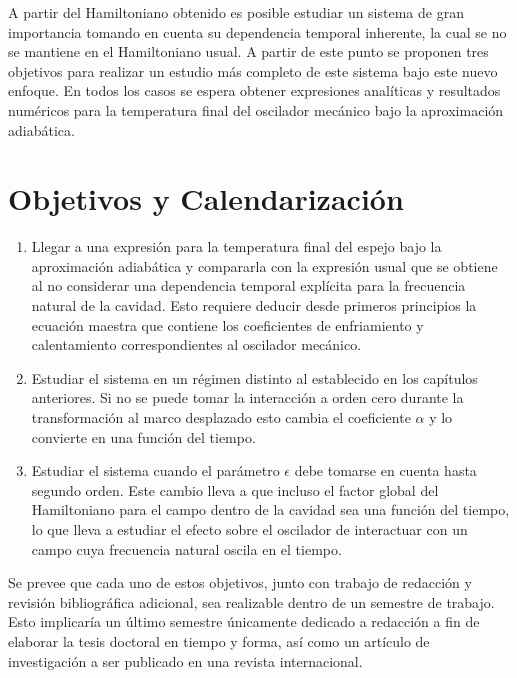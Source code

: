 \documentclass[10pt,a4paper]{report}
\begin{document}
A partir del Hamiltoniano obtenido es posible estudiar un sistema de gran importancia tomando en cuenta su dependencia temporal inherente, la cual se no se mantiene en el Hamiltoniano usual\cite{CavesIF}. A partir de este punto se proponen tres objetivos para realizar un estudio más completo de este sistema bajo este nuevo enfoque. En todos los casos se espera obtener expresiones analíticas y resultados numéricos  para la temperatura final del oscilador mecánico bajo la aproximación adiabática.

\section{Objetivos y Calendarización}

\begin{enumerate}
\item Llegar a una expresión para la temperatura final del espejo bajo la aproximación adiabática y compararla con la expresión usual que se obtiene al no considerar una dependencia temporal explícita para la frecuencia natural de la cavidad. Esto requiere deducir desde primeros principios la ecuación maestra que contiene los coeficientes de enfriamiento y calentamiento correspondientes al oscilador mecánico.

\item Estudiar el sistema en un régimen distinto al establecido en los capítulos anteriores. Si no se puede tomar la interacción a orden cero durante la transformación al marco desplazado esto cambia el coeficiente $\alpha$ y lo convierte en una función del tiempo.

\item Estudiar el sistema cuando el parámetro $\epsilon$ debe tomarse en cuenta hasta segundo orden. Este cambio lleva a que incluso el factor global del Hamiltoniano para el campo dentro de la cavidad sea una función del tiempo, lo que lleva a estudiar el efecto sobre el oscilador de interactuar con un campo cuya frecuencia natural oscila en el tiempo. 
\end{enumerate}

Se prevee que cada uno de estos objetivos, junto con trabajo de redacción y revisión bibliográfica adicional, sea realizable dentro de un semestre de trabajo. Esto implicaría un último semestre únicamente dedicado a redacción a fin de elaborar la tesis doctoral en tiempo y forma, así como un artículo de investigación a ser publicado en una revista internacional.











\end{document}
